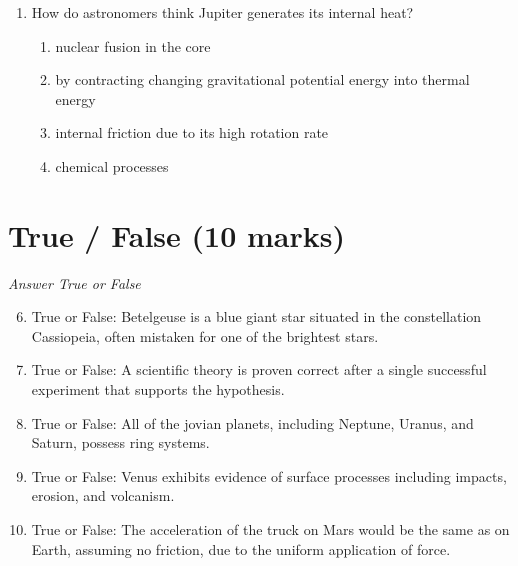 \documentclass[12pt]{article}
\begin{document}
\begin{enumerate}[label=\arabic*.]
sand bag on a planet with half the gravity compared to Earth?
\begin{enumerate}[label=(\alph*)]
    \item Mass 5kg weight 100N
    \item Mass 5kg weight 50N
    \item Mass 5kg weight 25N
    \item Mass 10kg weight 100N
\end{enumerate}
\item How do astronomers think Jupiter generates its internal heat?
\begin{enumerate}[label=(\alph*)]
    \item nuclear fusion in the core
    \item by contracting changing gravitational potential energy into thermal energy
    \item internal friction due to its high rotation rate
    \item chemical processes
\end{enumerate}
\end{enumerate}

\section*{True / False (10 marks)}
\textit{Answer True or False}
\begin{enumerate}[label=\arabic*.]
\setcounter{enumi}{5}
\item True or False: Betelgeuse is a blue giant star situated in the constellation Cassiopeia, often mistaken for one of the brightest stars.
\item True or False: A scientific theory is proven correct after a single successful experiment that supports the hypothesis.
\item True or False: All of the jovian planets, including Neptune, Uranus, and Saturn, possess ring systems.
\item True or False: Venus exhibits evidence of surface processes including impacts, erosion, and volcanism.
\item True or False: The acceleration of the truck on Mars would be the same as on Earth, assuming no friction, due to the uniform application of force.
\end{enumerate}
\end{document}
